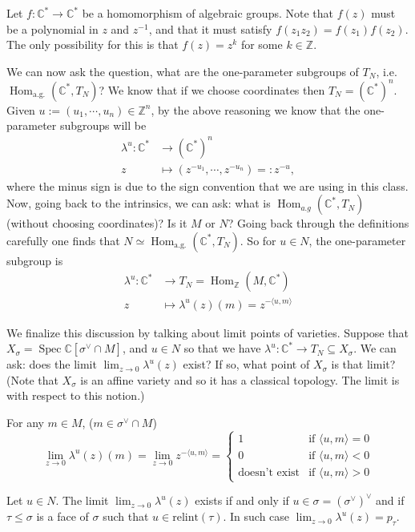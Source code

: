 \documentclass[a4paper,12pt]{amsart}
\newcommand{\ZZ}{\mathbb{Z}}
\newcommand{\CC}{\mathbb{C}}
\DeclareMathOperator{\Hom}{Hom}
\DeclareMathOperator{\Spec}{Spec}
\begin{document}
\begin{example}
	Let $f:\CC^*\rightarrow\CC^*$ be a homomorphism of algebraic groups. Note that $f(z)$ must be a polynomial in $z$ and $z^{-1}$, and that it must satisfy $f(z_1z_2)=f(z_1)f(z_2)$. The only possibility for this is that $f(z)=z^k$ for some $k\in\ZZ$.
\end{example}

We can now ask the question, what are the one-parameter subgroups of $T_N$, i.e. $\Hom_\text{a.g.}(\CC^*,T_N)$? We know that if we choose coordinates then $T_N=(\CC^*)^n$. Given $u:=(u_1,\cdots,u_n)\in\ZZ^n$, by the above reasoning we know that the one-parameter subgroups will be
\begin{align*}
\lambda^u:\CC^*&\rightarrow(\CC^*)^n\\
z&\mapsto(z^{-u_1},\cdots,z^{-u_n})=:z^{-u},
\end{align*}
where the minus sign is due to the sign convention that we are using in this class. Now, going back to the intrinsics, we can ask: what is $\Hom_{a.g}(\CC^*,T_N)$ (without choosing coordinates)? Is it $M$ or $N$? Going back through the definitions carefully one finds that $N\simeq\Hom_\text{a.g.}(\CC^*,T_N)$. So for $u\in N$, the one-parameter subgroup is
\begin{align*}
\lambda^u:\CC^*&\rightarrow T_N=\Hom_\ZZ(M,\CC^*)\\
z&\mapsto\lambda^u(z)(m)=z^{-\langle u,m\rangle}
\end{align*}

We  finalize this discussion by talking about limit points of varieties. Suppose that $X_\sigma=\Spec\CC[\sigma^\vee\cap M]$, and $u\in N$ so that we have $\lambda^u:\CC^*\rightarrow T_N\subseteq X_\sigma$. We can ask: does the limit $\lim_{z\rightarrow0}\lambda^u(z)$ exist? If so, what point of $X_\sigma$ is that limit? (Note that $X_\sigma$ is an affine variety and so it has a classical topology. The limit is with respect to this notion.)

For any $m\in M$, ($m\in\sigma^\vee\cap M$)
$$\lim_{z\rightarrow 0}\lambda^u(z)(m)=\lim_{z\rightarrow0}z^{-\langle u,m\rangle}=\begin{cases}
1&\text{if }\langle u,m\rangle=0\\
0&\text{if }\langle u,m\rangle<0\\
\text{doesn't exist}&\text{if }\langle u,m\rangle>0
\end{cases}$$

\begin{proposition}
	Let $u\in N$. The limit $\lim_{z\rightarrow0}\lambda^u(z)$ exists if and only if $u\in\sigma=(\sigma^\vee)^\vee$ and if $\tau\leq \sigma$ is a face of $\sigma$ such that $u\in\text{relint}(\tau)$. In such case $\lim_{z\rightarrow0}\lambda^u(z)=p_\tau$.
\end{proposition}
\end{document}
